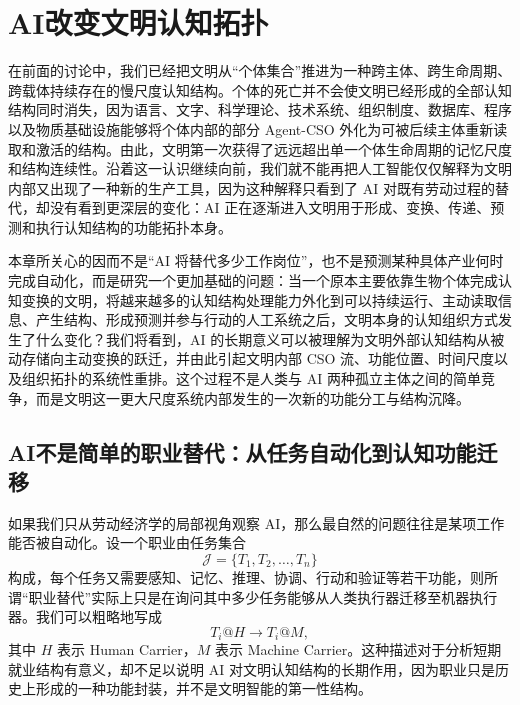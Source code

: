 \chapter{AI改变文明认知拓扑}
\label{chap:ai-civilization-topology}

\begin{chapterlead}
在前面的讨论中，我们已经把文明从“个体集合”推进为一种跨主体、跨生命周期、跨载体持续存在的慢尺度认知结构。个体的死亡并不会使文明已经形成的全部认知结构同时消失，因为语言、文字、科学理论、技术系统、组织制度、数据库、程序以及物质基础设施能够将个体内部的部分 Agent-CSO 外化为可被后续主体重新读取和激活的结构。由此，文明第一次获得了远远超出单一个体生命周期的记忆尺度和结构连续性。沿着这一认识继续向前，我们就不能再把人工智能仅仅解释为文明内部又出现了一种新的生产工具，因为这种解释只看到了 AI 对既有劳动过程的替代，却没有看到更深层的变化：AI 正在逐渐进入文明用于形成、变换、传递、预测和执行认知结构的功能拓扑本身。

本章所关心的因而不是“AI 将替代多少工作岗位”，也不是预测某种具体产业何时完成自动化，而是研究一个更加基础的问题：当一个原本主要依靠生物个体完成认知变换的文明，将越来越多的认知结构处理能力外化到可以持续运行、主动读取信息、产生结构、形成预测并参与行动的人工系统之后，文明本身的认知组织方式发生了什么变化？我们将看到，AI 的长期意义可以被理解为文明外部认知结构从被动存储向主动变换的跃迁，并由此引起文明内部 CSO 流、功能位置、时间尺度以及组织拓扑的系统性重排。这个过程不是人类与 AI 两种孤立主体之间的简单竞争，而是文明这一更大尺度系统内部发生的一次新的功能分工与结构沉降。
\end{chapterlead}


\section{AI不是简单的职业替代：从任务自动化到认知功能迁移}

如果我们只从劳动经济学的局部视角观察 AI，那么最自然的问题往往是某项工作能否被自动化。设一个职业由任务集合
\begin{equation}
\mathcal{J}
=
\{T_1,T_2,\ldots,T_n\}
\end{equation}
构成，每个任务又需要感知、记忆、推理、协调、行动和验证等若干功能，则所谓“职业替代”实际上只是在询问其中多少任务能够从人类执行器迁移至机器执行器。我们可以粗略地写成
\begin{equation}
T_i@H
\longrightarrow
T_i@M,
\end{equation}
其中 $H$ 表示 Human Carrier，$M$ 表示 Machine Carrier。这种描述对于分析短期就业结构有意义，却不足以说明 AI 对文明认知结构的长期作用，因为职业只是历史上形成的一种功能封装，并不是文明智能的第一性结构。

